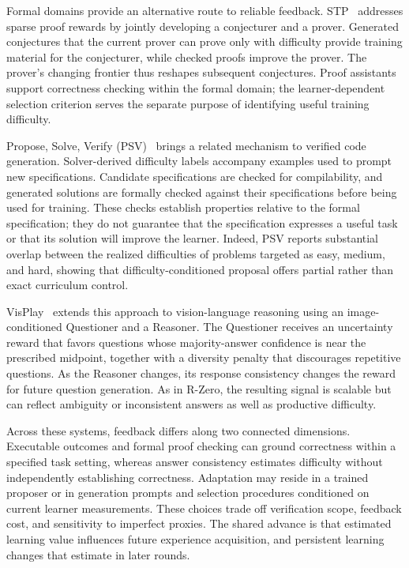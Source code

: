 Formal domains provide an alternative route to reliable feedback.
STP~\cite{dong2025stp} addresses sparse proof rewards by jointly developing a
conjecturer and a prover.
Generated conjectures that the current prover can prove only with difficulty
provide training material for the conjecturer, while checked proofs improve
the prover.
The prover's changing frontier thus reshapes subsequent conjectures.
Proof assistants support correctness checking within the formal domain;
the learner-dependent selection criterion serves the separate purpose of
identifying useful training difficulty.

Propose, Solve, Verify (PSV)~\cite{wilf2026psv} brings a related mechanism to
verified code generation.
Solver-derived difficulty labels accompany examples used to prompt new
specifications.
Candidate specifications are checked for compilability, and generated
solutions are formally checked against their specifications before being
used for training.
These checks establish properties relative to the formal specification;
they do not guarantee that the specification expresses a useful task or
that its solution will improve the learner.
Indeed, PSV reports substantial overlap between the realized difficulties
of problems targeted as easy, medium, and hard, showing that
difficulty-conditioned proposal offers partial rather than exact
curriculum control.

VisPlay~\cite{he2026visplay} extends this approach to vision-language
reasoning using an image-conditioned Questioner and a Reasoner.
The Questioner receives an uncertainty reward that favors questions whose
majority-answer confidence is near the prescribed midpoint, together with
a diversity penalty that discourages repetitive questions.
As the Reasoner changes, its response consistency changes the reward for
future question generation.
As in R-Zero, the resulting signal is scalable but can reflect ambiguity
or inconsistent answers as well as productive difficulty.

Across these systems, feedback differs along two connected dimensions.
Executable outcomes and formal proof checking can ground correctness
within a specified task setting, whereas answer consistency estimates
difficulty without independently establishing correctness.
Adaptation may reside in a trained proposer or in generation prompts and
selection procedures conditioned on current learner measurements.
These choices trade off verification scope, feedback cost, and sensitivity
to imperfect proxies.
The shared advance is that estimated learning value influences future
experience acquisition, and persistent learning changes that estimate in
later rounds.

